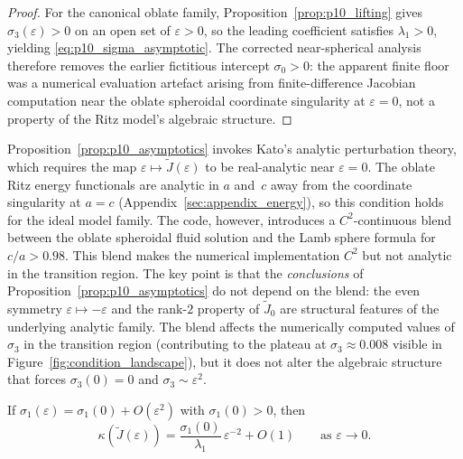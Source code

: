 \begin{proof}
For the canonical oblate family, Proposition~\ref{prop:p10_lifting} gives
$\sigma_3(\varepsilon)>0$ on an open set of $\varepsilon>0$, so the leading
coefficient satisfies $\lambda_1>0$, yielding
\eqref{eq:p10_sigma_asymptotic}.  The corrected near-spherical analysis
therefore removes the earlier fictitious intercept $\sigma_0>0$: the apparent
finite floor was a numerical evaluation artefact arising from finite-difference
Jacobian computation near the oblate spheroidal coordinate singularity at
$\varepsilon=0$, not a property of the Ritz model's algebraic structure.
\end{proof}

\begin{remark}
\label{rem:blend_independence}
Proposition~\ref{prop:p10_asymptotics} invokes Kato's analytic perturbation
theory, which requires the map $\varepsilon\mapsto\widetilde{J}(\varepsilon)$
to be real-analytic near $\varepsilon=0$.  The oblate Ritz energy functionals
are analytic in $a$ and~$c$ away from the coordinate singularity at $a=c$
(Appendix~\ref{sec:appendix_energy}), so this condition holds for the ideal
model family.  The code, however, introduces a $C^2$-continuous blend between
the oblate spheroidal fluid solution and the Lamb sphere formula for $c/a>0.98$.
This blend makes the numerical implementation $C^2$ but not analytic in the
transition region.  The key point is that the \emph{conclusions} of
Proposition~\ref{prop:p10_asymptotics} do not depend on the blend: the even
symmetry $\varepsilon\mapsto -\varepsilon$ and the rank-$2$ property of
$\widetilde{J}_0$ are structural features of the underlying analytic family.
The blend affects the numerically computed values of $\sigma_3$ in the
transition region (contributing to the plateau at $\sigma_3\approx 0.008$
visible in Figure~\ref{fig:condition_landscape}), but it does not alter
the algebraic structure that forces $\sigma_3(0)=0$ and
$\sigma_3\sim\varepsilon^2$.
\end{remark}

\begin{corollary}
\label{cor:p10_kappa_asymptotic}
If $\sigma_1(\varepsilon)=\sigma_1(0)+O(\varepsilon^2)$ with $\sigma_1(0)>0$,
then
\begin{equation}
  \kappa(\widetilde{J}(\varepsilon))
  =
  \frac{\sigma_1(0)}{\lambda_1}\,\varepsilon^{-2} + O(1)
  \qquad \text{as } \varepsilon \to 0.
\end{equation}
\end{corollary}

